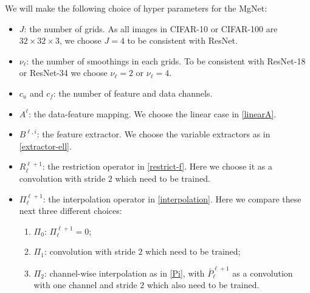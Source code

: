 We will make the following choice of hyper parameters
for the MgNet:
\begin{itemize}
	\item $J$: the number of grids. As all images in CIFAR-10 or CIFAR-100
	are $32\times 32 \times 3$,  we choose $J = 4$ to be consistent with ResNet.
	\item $\nu_\ell$:  the number of smoothings in each grids. To be consistent with
	ResNet-18 or ResNet-34 we choose $\nu_\ell = 2$ or $\nu_\ell = 4$.
	\item $c_u$ and $c_f$: the number of feature and data channels. 
	\item $A^\ell$: the data-feature mapping. We choose the linear case in \eqref{linearA}.
	\item $B^{\ell,i}$: the feature extractor. We choose the variable extractors as in \eqref{extractor-ell}.
	\item $R_{\ell}^{\ell+1}$: the restriction operator in \eqref{restrict-f}. 
	Here we choose it as a convolution with stride $2$ which need to be trained.
	\item $\Pi_\ell^{\ell+1}$: the interpolation operator in
	\eqref{interpolation}.  Here we compare these next three
	different choices: 
	\begin{enumerate}
		\item {$\Pi_0$: } $\Pi_\ell^{\ell+1} = 0$;
		\item {$\Pi_1$: }convolution with stride $2$ which need to be
		trained; 
		\item {$\Pi_2$: }channel-wise interpolation as in
		\eqref{Pi}, with $\bar P_{\ell}^{\ell+1}$ as a convolution
		with one channel and stride $2$ which also need to be trained.
	\end{enumerate}
\end{itemize}

